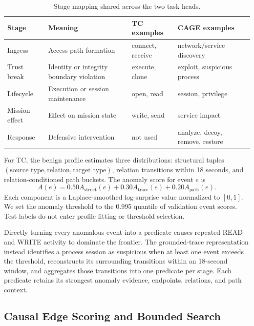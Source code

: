 \documentclass[runningheads]{llncs}
\begin{document}
\begin{table}[t]
\caption{Stage mapping shared across the two task heads.}
\label{tab:stages}
\centering
\small
\begin{tabular}{>{\raggedright\arraybackslash}p{1.35cm}>{\raggedright\arraybackslash}p{2.65cm}>{\raggedright\arraybackslash}p{2.55cm}>{\raggedright\arraybackslash}p{2.65cm}}
\toprule
Stage & Meaning & TC examples & CAGE examples \\
\midrule
Ingress & Access path formation & connect, receive & network/service discovery \\
Trust break & Identity or integrity boundary violation & execute, clone & exploit, suspicious process \\
Lifecycle & Execution or session maintenance & open, read & session, privilege \\
Mission effect & Effect on mission state & write, send & service impact \\
Response & Defensive intervention & not used & analyze, decoy, remove, restore \\
\bottomrule
\end{tabular}
\end{table}

For TC, the benign profile estimates three distributions: structural tuples $(\text{source type},\text{relation},\text{target type})$, relation transitions within 18 seconds, and relation-conditioned path buckets. The anomaly score for event $e$ is
\begin{equation}
A(e)=0.50A_{\mathrm{struct}}(e)+0.30A_{\mathrm{trace}}(e)
+0.20A_{\mathrm{path}}(e).
\label{eq:anomaly}
\end{equation}
Each component is a Laplace-smoothed log-surprise value normalized to $[0,1]$. We set the anomaly threshold to the 0.995 quantile of validation event scores. Test labels do not enter profile fitting or threshold selection.

Directly turning every anomalous event into a predicate causes repeated READ and WRITE activity to dominate the frontier. The grounded-trace representation instead identifies a process session as suspicious when at least one event exceeds the threshold, reconstructs its surrounding transitions within an 18-second window, and aggregates those transitions into one predicate per stage. Each predicate retains its strongest anomaly evidence, endpoints, relations, and path context.

\subsection{Causal Edge Scoring and Bounded Search}
\end{document}
